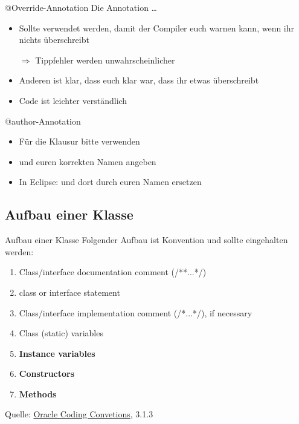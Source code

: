 \documentclass[usepdftitle=false,hyperref={pdfpagelabels=false}]{beamer}
\begin{document}
\begin{frame}{@Override-Annotation}
    Die Annotation  \dots
    \begin{itemize}[<+->]
        \item Sollte verwendet werden, damit der Compiler euch warnen
              kann, wenn ihr nichts überschreibt
        \item[$\Rightarrow$] Tippfehler werden unwahrscheinlicher
        \item Anderen ist klar, dass euch klar war, dass ihr etwas
              überschreibt
        \item Code ist leichter verständlich
    \end{itemize}
\end{frame}

\begin{frame}{@author-Annotation}
    \begin{itemize}
        \item Für die Klausur bitte  verwenden
        \item und euren korrekten Namen angeben
        \item In Eclipse: 
              und dort  durch euren Namen ersetzen
    \end{itemize}
\end{frame}

\subsection{Aufbau einer Klasse}
\begin{frame}{Aufbau einer Klasse}
    Folgender Aufbau ist Konvention und sollte eingehalten werden:
    \begin{enumerate}
        \item Class/interface documentation comment (/**...*/)
        \item class or interface statement
        \item Class/interface implementation comment (/*...*/), if necessary
        \item Class (static) variables
        \item \textbf{Instance variables}
        \item \textbf{Constructors}
        \item \textbf{Methods}
    \end{enumerate}
    Quelle: \href{http://www.oracle.com/technetwork/java/codeconventions-150003.pdf}{Oracle Coding Convetions}, 3.1.3
\end{frame}
\end{document}
